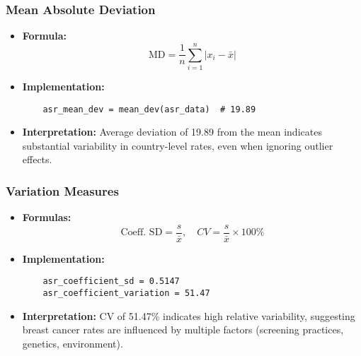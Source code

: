 \begin{frame}[fragile]
    \frametitle{Mean Absolute Deviation}
    \begin{itemize}
        \item \textbf{Formula:}
              \[
                  \text{MD} = \frac{1}{n} \sum_{i=1}^n |x_i - \bar{x}|
              \]


        \item \textbf{Implementation:}
              \begin{lstlisting}
    asr_mean_dev = mean_dev(asr_data)  # 19.89
                                    \end{lstlisting}

        \item \textbf{Interpretation:} Average deviation of \SI{19.89}{\perthousand} from the mean indicates substantial variability in country-level rates, even when ignoring outlier effects.
    \end{itemize}
\end{frame}

\begin{frame}[fragile]
    \frametitle{Variation Measures}
    \begin{itemize}
        \item \textbf{Formulas:}
              \[
                  \text{Coeff. SD} = \frac{s}{\bar{x}},\quad CV = \frac{s}{\bar{x}} \times 100\%
              \]

        \item \textbf{Implementation:}
              \begin{lstlisting}
    asr_coefficient_sd = 0.5147
    asr_coefficient_variation = 51.47
                                        \end{lstlisting}

        \item \textbf{Interpretation:} CV of 51.47\% indicates high relative variability, suggesting breast cancer rates are influenced by multiple factors (screening practices, genetics, environment).
    \end{itemize}
\end{frame}

